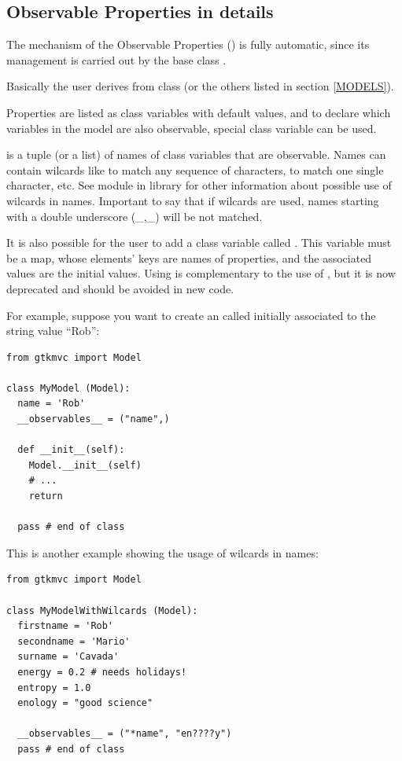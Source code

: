 \subsection{\label{OPD}Observable Properties in details}
The mechanism of the Observable Properties (\OP) is fully automatic,
since its management is carried out by the base class
.

Basically the user derives from class  (or the others
listed in section \ref{MODELS}). 

Properties are listed as class variables with default values, and
to declare which variables in the model are also observable,
special class variable \OBSvar can be used. 

\OBSvar is a tuple (or a list) of names of class variables that are
observable. Names can contain wilcards like \codename{*} to match
any sequence of characters,  to match one single
character, etc. See module  in \python library
for other information about possible use of wilcards in
names. Important to say that if wilcards are used, names starting
with a double underscore \codename(\_,\_) will be not matched.

It is also possible for the user to add a class variable called
\OPvar. This variable must be a map, whose elements' keys are names
of properties, and the associated values are the initial
values. Using \OPvar is complementary to the use of \OBSvar, but it
is now deprecated and should be avoided in new code.

For example, suppose you want to create an \OP called  
initially associated to the string value ``Rob'':

{ \codesize 
\begin{verbatim} 
from gtkmvc import Model

class MyModel (Model):
  name = 'Rob'
  __observables__ = ("name",)

  def __init__(self):
    Model.__init__(self)
    # ...
    return

  pass # end of class
\end{verbatim}
}

This is another example showing the usage of wilcards in names:
{ \codesize 
\begin{verbatim} 
from gtkmvc import Model

class MyModelWithWilcards (Model):
  firstname = 'Rob'
  secondname = 'Mario'
  surname = 'Cavada'
  energy = 0.2 # needs holidays!
  entropy = 1.0
  enology = "good science"

  __observables__ = ("*name", "en????y")
  pass # end of class
\end{verbatim}
}

